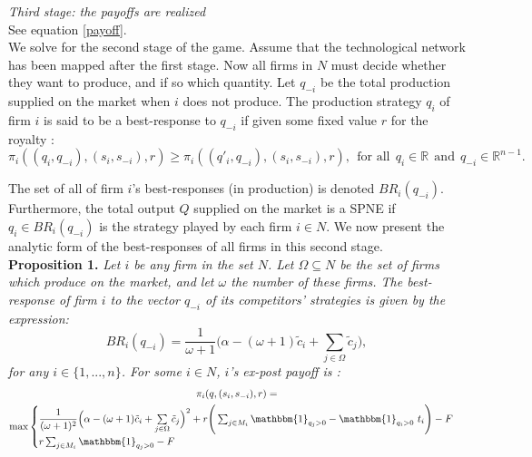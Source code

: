 \documentclass{article}
\begin{document}
\textit{Third stage: the payoffs are realized}\\

See equation \ref{payoff}. \\

\indent We solve for the second stage of the game. Assume that the technological network  has been mapped after the first stage. Now all firms in $N$ must decide whether they want to produce, and if so which quantity. Let $q_{-i}$ be the total production supplied on the market when $i$ does not produce. The production strategy $q_i$ of firm $i$ is said to be a best-response to $q_{-i}$ if given some fixed value $r$ for the royalty : 
\begin{equation}
\pi_i((q_i,q_{-i}), (s_i,s_{-i}),r)\geq \pi_i((q'_i,q_{-i}), (s_i,s_{-i}), r),~~\text{for all}~~q_i\in \mathbb{R}~~\text{and}~~q_{-i}\in \mathbb{R}^{n-1}.
\end{equation}

The set of all of firm $i$'s best-responses (in production) is denoted $BR_i(q_{-i})$. Furthermore, the total output $Q$ supplied on the market is a SPNE if $q_i\in BR_i(q_{-i})$ is the strategy played by each firm $i\in N$. We now present the analytic form of the best-responses of all firms in this second stage.\\

\textbf{Proposition 1.} \textit{Let $i$ be any firm in the set $N$. Let $\Omega\subseteq N$ be the set of firms which produce on the market, and let $\omega$ the number of these firms. The best-response of firm $i$ to the vector $q_{-i}$ of its competitors' strategies is given by the expression: }
\begin{equation}
BR_i(q_{-i}) = \dfrac{1}{\omega+1}\Big(\alpha - (\omega+1)\tilde{c}_i + \sum \limits_{ j\in \Omega}\tilde{c}_j \Big), \label{BR}
\end{equation}
\textit{for any $i \in \{1,...,n\} $. For some $i\in N$, $i$'s ex-post payoff is :}
\begin{multline} 
\pi_i(q, (s_i,s_{-i}),r)=\\
\max 
\begin{cases}
\dfrac{1}{(\omega+1)^2}\Big(\alpha - (\omega+1)\tilde{c}_i + \sum \limits_{ j\in \Omega}\tilde{c}_j \Big) ^2 + r\Bigg( \sum_{j\in M_i}\mathbbm{1}_{q_j>0} - \mathbbm{1}_{q_i>0}~ t_i\Bigg)  - F 
 \\
 r  \sum_{j\in M_i}\mathbbm{1}_{q_j>0}-F
\end{cases}\\
\end{multline}
\end{document}
